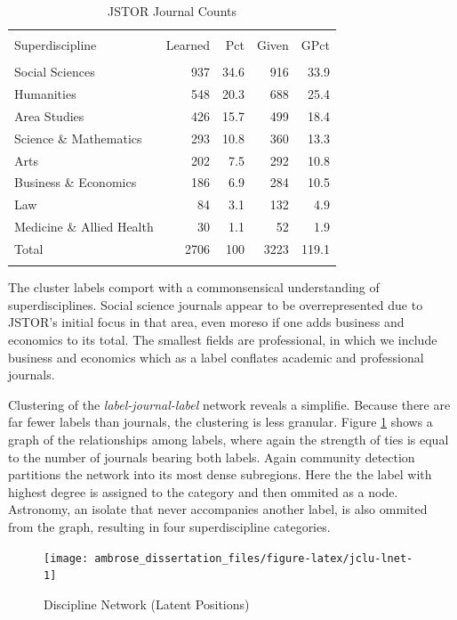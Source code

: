 \documentclass[]{book}
\begin{document}
\begin{table}[!htbp] \centering 
  \caption{JSTOR Journal Counts} 
  \label{tab:jclu-tab-sup} 
\begin{tabular}{@{\extracolsep{5pt}} lrrrr} 
\\[-1.8ex]\hline 
\hline \\[-1.8ex] 
Superdiscipline & Learned & Pct & Given & GPct \\ 
\hline \\[-1.8ex] 
Social Sciences & 937 & 34.6 & 916 & 33.9 \\ 
Humanities & 548 & 20.3 & 688 & 25.4 \\ 
Area Studies & 426 & 15.7 & 499 & 18.4 \\ 
Science \& Mathematics & 293 & 10.8 & 360 & 13.3 \\ 
Arts & 202 & 7.5 & 292 & 10.8 \\ 
Business \& Economics & 186 & 6.9 & 284 & 10.5 \\ 
Law & 84 & 3.1 & 132 & 4.9 \\ 
Medicine \& Allied Health & 30 & 1.1 & 52 & 1.9 \\ 
Total & 2706 & 100 & 3223 & 119.1 \\ 
\hline \\[-1.8ex] 
\end{tabular} 
\end{table}

The cluster labels comport with a commonsensical understanding of
superdisciplines. Social science journals appear to be overrepresented
due to JSTOR's initial focus in that area, even moreso if one adds
business and economics to its total. The smallest fields are
professional, in which we include business and economics which as a
label conflates academic and professional journals.

Clustering of the \emph{label-journal-label} network reveals a
simplifie. Because there are far fewer labels than journals, the
clustering is less granular. Figure \ref{fig:jclu-lnet} shows a graph of
the relationships among labels, where again the strength of ties is
equal to the number of journals bearing both labels. Again community
detection partitions the network into its most dense subregions. Here
the the label with highest degree is assigned to the category and then
ommited as a node. Astronomy, an isolate that never accompanies another
label, is also ommited from the graph, resulting in four superdiscipline
categories.

\begin{figure}

{\centering \texttt{[image: ambrose\_dissertation\_files/figure-latex/jclu-lnet-1]} 

}

\caption{Discipline Network (Latent Positions)}\label{fig:jclu-lnet}
\end{figure}
\end{document}
